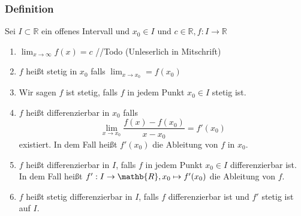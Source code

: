 \documentclass{article}
\begin{document}
    \subsubsection{Definition}
      Sei $I \subset \mathbb{R}$ ein offenes Intervall und $x_0 \in I$ und
      $c \in \mathbb{R}, f: I \to \mathbb{R}$
      \begin{enumerate}[label=(\roman*)]
        \item $\displaystyle\lim_{x \to \infty} f(x)=c$ //Todo (Unleserlich in Mitschrift)
        \item $f$ heißt stetig in $x_0$ falls $\displaystyle\lim_{x \to x_0} = f(x_0)$
        \item Wir sagen $f$ ist stetig, falls $f$ in jedem Punkt $x_0 \in I$ stetig ist.
        \item $f$ heißt differenzierbar in $x_0$ falls
          \begin{displaymath}
            \lim_{x \to x_0} \frac{f(x)-f(x_0)}{x-x_0} = f'(x_0)
          \end{displaymath}
          existiert. In dem Fall heißt $f'(x_0)$ die Ableitung von $f$ in $x_0$.
        \item $f$ heißt differenzierbar in $I$, falls $f$ in jedem Punkt $x_0 \in I$
          differenzierbar ist. In dem Fall heißt $f': I \to \mathb{R}, x_0 \mapsto f'(x_0)$
          die Ableitung von $f$.
        \item $f$ heißt stetig differenzierbar in $I$, falls $f$ differenzierbar
          ist und $f'$ stetig ist auf $I$.
      \end{enumerate}
\end{document}
